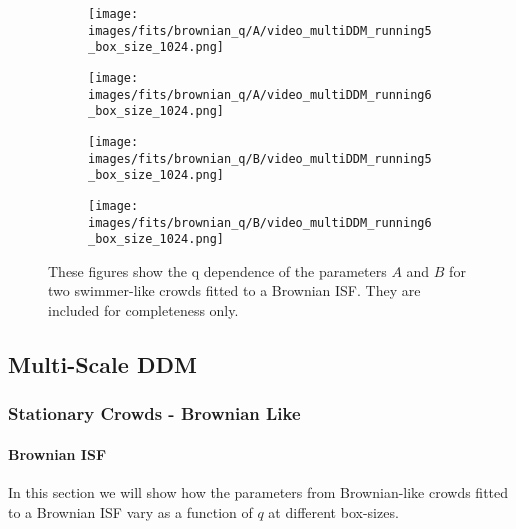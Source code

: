 \documentclass[10pt]{article}
\begin{document}
\begin{figure}[H]
\begin{subfigure}[t]{.5\textwidth}
  \centering
  \texttt{[image: images/fits/brownian\_q/A/video\_multiDDM\_running5\_box\_size\_1024.png]}
  \caption{}
\end{subfigure}%
\hfill
\begin{subfigure}[t]{.5\textwidth}
  \centering
  \texttt{[image: images/fits/brownian\_q/A/video\_multiDDM\_running6\_box\_size\_1024.png]}
  \caption{}
\end{subfigure}
\label{fig:running_brownian_fits_A}
\par\bigskip
\begin{subfigure}[t]{.5\textwidth}
  \centering
  \texttt{[image: images/fits/brownian\_q/B/video\_multiDDM\_running5\_box\_size\_1024.png]}
  \caption{}
\end{subfigure}%
\hfill
\begin{subfigure}[t]{.5\textwidth}
  \centering
  \texttt{[image: images/fits/brownian\_q/B/video\_multiDDM\_running6\_box\_size\_1024.png]}
  \caption{}
\end{subfigure}
\caption{These figures show the q dependence of the parameters $A$ and $B$ for two swimmer-like crowds fitted to a Brownian ISF. They are included for completeness only.}
\label{fig:running_brownian_fits_B}
\end{figure}

\clearpage
\subsection{Multi-Scale DDM}

\subsubsection{Stationary Crowds - Brownian Like}
\paragraph{Brownian ISF} In this section we will show how the parameters from Brownian-like crowds fitted to a Brownian ISF vary as a function of $q$ at different box-sizes. 
\end{document}

